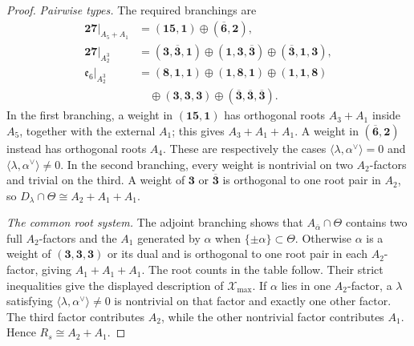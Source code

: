 \documentclass[11pt]{article}
\theoremstyle{remark}
\newcommand{\e}{\mathfrak e}
\begin{document}
\begin{proof}
\emph{Pairwise types.} The required branchings \cite{Slansky,McKayPatera} are
\[
\begin{aligned}
\mathbf{27}|_{A_5+A_1}
 &=(\mathbf{15},\mathbf1)
   \oplus(\overline{\mathbf6},\mathbf2),\\
\mathbf{27}|_{A_2^3}
 &=(\mathbf3,\overline{\mathbf3},\mathbf1)
   \oplus(\mathbf1,\mathbf3,\overline{\mathbf3})
   \oplus(\overline{\mathbf3},\mathbf1,\mathbf3),\\
\e_6|_{A_2^3}
 &=(\mathbf8,\mathbf1,\mathbf1)
   \oplus(\mathbf1,\mathbf8,\mathbf1)
   \oplus(\mathbf1,\mathbf1,\mathbf8)\\
 &\quad\oplus(\mathbf3,\mathbf3,\mathbf3)
   \oplus(\overline{\mathbf3},\overline{\mathbf3},
           \overline{\mathbf3}).
\end{aligned}
\]
In the first branching, a weight in
\((\mathbf{15},\mathbf1)\) has orthogonal roots
\(A_3+A_1\) inside \(A_5\), together with the external \(A_1\);
this gives \(A_3+A_1+A_1\). A weight in
\((\overline{\mathbf6},\mathbf2)\) instead has orthogonal roots \(A_4\).
These are respectively the cases
\(\langle\lambda,\alpha^\vee\rangle=0\) and
\(\langle\lambda,\alpha^\vee\rangle\ne0\). In the second branching,
every weight is nontrivial on two \(A_2\)-factors and trivial on the
third. A weight of \(\mathbf3\) or \(\overline{\mathbf3}\) is
orthogonal to one root pair in \(A_2\), so
\(D_\lambda\cap\Theta\cong A_2+A_1+A_1\).

\emph{The common root system.} The adjoint branching shows that
\(A_{\bar\alpha}\cap\Theta\) contains two full \(A_2\)-factors and the
\(A_1\) generated by \(\alpha\) when
\(\{\pm\alpha\}\subset\Theta\). Otherwise \(\alpha\) is a weight of
\((\mathbf3,\mathbf3,\mathbf3)\) or its dual and is orthogonal to one
root pair in each \(A_2\)-factor, giving \(A_1+A_1+A_1\). The root counts in the table follow. Their strict inequalities give the displayed
description of \(\mathcal X_{\max}\). If \(\alpha\) lies in one \(A_2\)-factor, a
\(\lambda\) satisfying \(\langle\lambda,\alpha^\vee\rangle\ne0\) is
nontrivial on that factor and exactly one other factor. The third
factor contributes \(A_2\), while the other nontrivial factor contributes
\(A_1\). Hence \(R_s\cong A_2+A_1\).


\end{proof}
\end{document}
